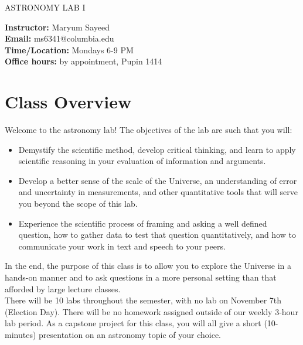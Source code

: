 \documentclass[10pt]{article}
\begin{document}
 
\begin{center}
{\huge ASTRONOMY LAB I}\\
\end{center}
 
\bigskip
 
 
\noindent \textbf{\normalsize Instructor:} {\normalsize Maryum Sayeed} \\ 
\textbf{\normalsize Email:} {\normalsize ms6341@columbia.edu}\\
\noindent \textbf{\normalsize Time/Location:} {\normalsize Mondays 6-9 PM} \\
\textbf{\normalsize Office hours:} {\normalsize by appointment, Pupin 1414}

 
\section*{Class Overview}
 
Welcome to the astronomy lab! The objectives of the lab are such that you will:
\begin{itemize}
\item Demystify the scientific method, develop critical thinking, and learn to apply scientific reasoning in your evaluation of information and arguments.
\item Develop a better sense of the scale of the Universe, an understanding of error and uncertainty in measurements, and other quantitative tools that will serve you beyond the scope of this lab.
\item Experience the scientific process of framing and asking a well defined question, how to gather data to test that question quantitatively, and how to communicate your work in text and speech to your peers.
\end{itemize}

\noindent In the end, the purpose of this class is to allow you to explore the Universe in a hands-on manner and to ask questions in a more personal setting than that afforded by large lecture classes. \\

\noindent There will be 10 labs throughout the semester, with no lab on November 7th (Election Day). There will be no homework assigned outside of our weekly 3-hour lab period. As a capstone project for this class, you will all give a short (10-minutes) presentation on an astronomy topic of your choice.

\end{document}
